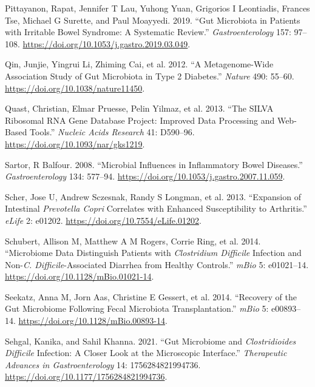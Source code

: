 \documentclass[
  11pt,
]{article}
\newlength{\cslhangindent}
\newenvironment{CSLReferences}[2] %
 {\begin{list}{}{%
  \setlength{\itemindent}{0pt}
  \setlength{\leftmargin}{0pt}
  \setlength{\parsep}{0pt}
  \ifodd #1
   \setlength{\leftmargin}{\cslhangindent}
   \setlength{\itemindent}{-1\cslhangindent}
  \fi
  \setlength{\itemsep}{#2\baselineskip}}}
 {\end{list}}
\begin{document}
\begin{CSLReferences}{1}{0}
Pittayanon, Rapat, Jennifer T Lau, Yuhong Yuan, Grigorios I Leontiadis,
Frances Tse, Michael G Surette, and Paul Moayyedi. 2019. {``Gut
Microbiota in Patients with Irritable Bowel Syndrome: A Systematic
Review.''} \emph{Gastroenterology} 157: 97--108.
\url{https://doi.org/10.1053/j.gastro.2019.03.049}.

Qin, Junjie, Yingrui Li, Zhiming Cai, et al. 2012. {``A Metagenome-Wide
Association Study of Gut Microbiota in Type 2 Diabetes.''} \emph{Nature}
490: 55--60. \url{https://doi.org/10.1038/nature11450}.

Quast, Christian, Elmar Pruesse, Pelin Yilmaz, et al. 2013. {``The
{SILVA} Ribosomal {RNA} Gene Database Project: Improved Data Processing
and Web-Based Tools.''} \emph{Nucleic Acids Research} 41: D590--96.
\url{https://doi.org/10.1093/nar/gks1219}.

Sartor, R Balfour. 2008. {``Microbial Influences in Inflammatory Bowel
Diseases.''} \emph{Gastroenterology} 134: 577--94.
\url{https://doi.org/10.1053/j.gastro.2007.11.059}.

Scher, Jose U, Andrew Sczesnak, Randy S Longman, et al. 2013.
{``Expansion of Intestinal \emph{{P}revotella Copri} Correlates with
Enhanced Susceptibility to Arthritis.''} \emph{eLife} 2: e01202.
\url{https://doi.org/10.7554/eLife.01202}.

Schubert, Allison M, Matthew A M Rogers, Corrie Ring, et al. 2014.
{``Microbiome Data Distinguish Patients with \emph{{C}lostridium
Difficile} Infection and Non-\emph{{C}. Difficile}-Associated Diarrhea
from Healthy Controls.''} \emph{mBio} 5: e01021--14.
\url{https://doi.org/10.1128/mBio.01021-14}.

Seekatz, Anna M, Jorn Aas, Christine E Gessert, et al. 2014. {``Recovery
of the Gut Microbiome Following Fecal Microbiota Transplantation.''}
\emph{mBio} 5: e00893--14. \url{https://doi.org/10.1128/mBio.00893-14}.

Sehgal, Kanika, and Sahil Khanna. 2021. {``Gut Microbiome and
\emph{{C}lostridioides Difficile} Infection: A Closer Look at the
Microscopic Interface.''} \emph{Therapeutic Advances in
Gastroenterology} 14: 1756284821994736.
\url{https://doi.org/10.1177/1756284821994736}.


\end{CSLReferences}
\end{document}
